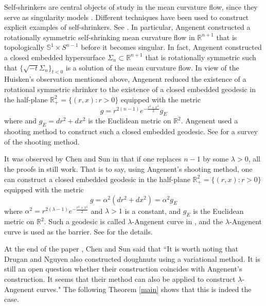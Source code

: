 \documentclass{amsart}
\theoremstyle{Corollary}
\numberwithin{equation}{section}
\begin{document}
Self-shrinkers are central objects of study in the
mean curvature flow, since they serve as singularity models \cite{Huisken1}.
Different techniques have been used to construct explicit
examples of self-shrinkers. See \cite{BNS,CLW,KKM,KM,N,R}. 
In particular, 
Angenent \cite{Angenent3} constructed
a rotationally symmetric
self-shrinking mean curvature flow
in $\mathbb{R}^{n+1}$
that is topologically $\mathbb{S}^1\times S^{n-1}$ before it becomes singular.
In fact, Angenent constructed a closed embedded hypersurface $\Sigma_n\subset \mathbb{R}^{n+1}$
that is rotationally symmetric such that $\{\sqrt{-t}\Sigma_n\}_{t<0}$ is 
a solution of the mean curvature flow. 
In view of the Huisken's observation mentioned above,  Angenent reduced the existence of a rotational symmetric shrinker
to the existence of a closed embedded geodesic in the half-plane $\mathbb{R}^2_+=\{(r,x): r>0\}$ equipped
with the metric
$$g=r^{2(n-1)}e^{-\frac{r^2+x^2}{2}} g_E$$
where
and $g_E=dr^2+dx^2$ is the Euclidean metric on $\mathbb{R}^2$.
Angenent used a shooting method to construct such a closed embedded geodesic.
See \cite{Drugan&Lee&Nguyen} for a survey of the shooting method.

It was observed by Chen and Sun in \cite[Appendix B]{Chen&Sun}
that if one replaces $n-1$ by some $\lambda>0$,
all the proofs in \cite{Angenent3} still work.
That is to say, using Angenent's shooting method,
one can construct a closed embedded geodesic
in the half-plane $\mathbb{R}^2_+=\{(r,x): r>0\}$ equipped
with the metric
\begin{equation}\label{metric}
g=\alpha^2(dr^2+dx^2)=\alpha^2 g_E
\end{equation}
where
$\alpha^2=r^{2(\lambda-1)}e^{-\frac{r^2+x^2}{2}}$ and $\lambda>1$ is a constant,
and $g_E$ is the Euclidean metric on $\mathbb{R}^2$.
Such a geodesic is called $\lambda$-Angenent curve in \cite{Chen&Sun},
and the $\lambda$-Angenent curve is used as the barrier. See \cite{Chen&Sun} for the details.





At the end of the paper \cite{Chen&Sun}, Chen and Sun said that
``It is worth noting that Drugan and Nguyen \cite{Drugan&Nguyen}
also constructed doughnuts using a variational method.
It is still an open question whether
their construction coincides with Angenent's construction.
It seems that their method can also be applied to construct $\lambda$-Angenent curves."
The following Theorem \ref{main} shows that this is indeed the case.
\end{document}
